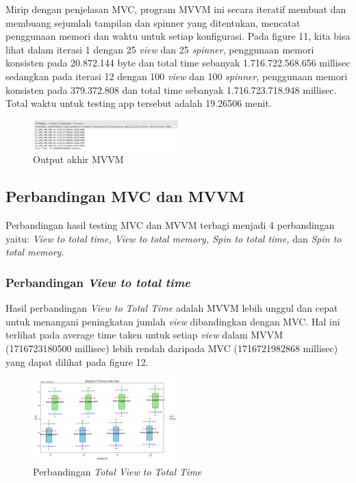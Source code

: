 \documentclass[conference]{IEEEtran}
\begin{document}
	Mirip dengan penjelasan MVC, program MVVM ini secara iteratif membuat dan membuang sejumlah tampilan dan spinner yang ditentukan, mencatat penggunaan memori dan waktu untuk setiap konfigurasi.  Pada figure 11, kita bisa lihat dalam iterasi 1 dengan 25 \textit{view} dan 25 \textit{spinner}, penggunaan memori konsisten pada 20.872.144 byte dan total time sebanyak 1.716.722.568.656 millisec sedangkan pada iterasi 12 dengan 100 \textit{view} dan 100 \textit{spinner}, penggunaan memori konsisten pada 379.372.808 dan total time sebanyak 1.716.723.718.948 millisec. Total waktu untuk testing app tersebut adalah 19.26506 menit.
	
	\begin{figure}[h]
		\centering
		\includegraphics[width=0.5\textwidth]{images/ENDMVVM}
		\caption{Output akhir MVVM}
		\label{fig:end_mvvm}
	\end{figure}
	
	\subsection{Perbandingan MVC dan MVVM}
	Perbandingan hasil testing MVC dan MVVM terbagi menjadi 4 perbandingan yaitu: \textit{View to total time, View to total memory, Spin to total time,} dan \textit{Spin to total memory}.
	\subsubsection{Perbandingan \textit{View to total time}}
	Hasil perbandingan \textit{View to Total Time} adalah MVVM lebih unggul dan cepat untuk menangani peningkatan jumlah \textit{view} dibandingkan dengan MVC. Hal ini terlihat pada average time taken untuk setiap \textit{view} dalam MVVM (1716723180500 millisec) lebih rendah daripada MVC (1716721982868 millisec) yang dapat dilihat pada figure 12.
	
	\begin{figure}[h]
		\centering
		\includegraphics[width=0.5\textwidth]{../mvc-mvvm/plot_view_total_time.pdf}
		\caption{Perbandingan \textit{Total View to Total Time}}
		\label{fig:total_view_to_total_time}
	\end{figure}
	
\end{document}
